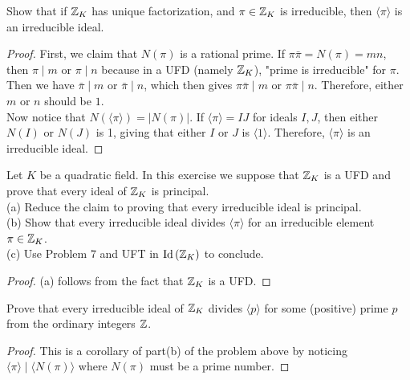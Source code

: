 \documentclass[12pt,twoside=semi,openright,numbers=noenddot]{scrbook}
\begin{document}
\begin{problem}
    Show that if $\mathbb Z_{K}$ has unique factorization, and $\pi \in \mathbb Z_{K}$ is irreducible, then $\langle\pi\rangle$ is an irreducible ideal.
\end{problem}
    \begin{proof}
        First, we claim that $N(\pi)$ is a rational prime. If $\pi\bar{\pi} = N(\pi) = mn$, then $\pi \mid m$ or $\pi \mid n$ 
        because in a UFD (namely $\mathbb Z_K$), "prime is irreducible" for $\pi$. Then we have $\bar{\pi} \mid m$ or $\bar{\pi}\mid n$, 
        which then gives $\pi\bar{\pi} \mid m$ or $\pi\bar{\pi} \mid n$. Therefore, either $m$ or $n$ should be $1$. \\
        Now notice that $N(\langle\pi\rangle) = |N(\pi)|$. If $\langle\pi\rangle = IJ$ for ideals $I, J$, then either $N(I)$ or $N(J)$ is 1, giving that 
        either $I$ or $J$ is $\langle 1 \rangle$. Therefore, $\langle \pi \rangle$ is an irreducible ideal. 
    \end{proof}

\begin{problem}
    Let $K$ be a quadratic field. In this exercise we suppose that $\mathbb Z_{K}$ is a UFD and prove that every ideal of $\mathbb Z_{K}$ is principal. \\
    (a) Reduce the claim to proving that every irreducible ideal is principal.\\
    (b) Show that every irreducible ideal divides $\langle\pi\rangle$ for an irreducible element $\pi \in \mathbb Z_{K}$. \\
    (c) Use Problem 7 and UFT in $\operatorname{Id}\left(\mathbb Z_{K}\right)$ to conclude.
\end{problem}
    \begin{proof}
        (a) follows from the fact that $\mathbb Z_K$ is a UFD. 
    \end{proof}

\begin{problem}
    Prove that every irreducible ideal of $\mathbb Z_{K}$ divides $\langle p\rangle$ for some (positive) prime $p$ from the ordinary integers $\mathbb Z$.
\end{problem}
    \begin{proof}
        This is a corollary of part(b) of the problem above by noticing $\langle \pi \rangle \mid \langle N(\pi) \rangle$ where $N(\pi)$ must be a prime number.
    \end{proof}
\end{document}
